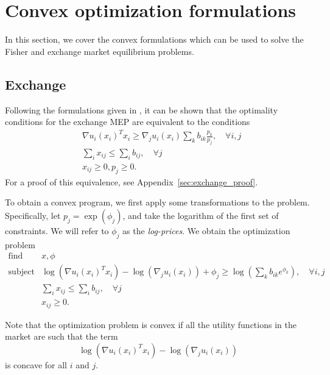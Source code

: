 \documentclass[12pt]{article}
\begin{document}
\section{Convex optimization formulations}
\label{sec:convex_form}
In this section, we cover the convex formulations which can be used to solve
the Fisher and exchange market equilibrium problems.

\subsection{Exchange}
\label{sec:convex_form_exchange}
Following the formulations given in \cite{jain2007polynomial, chen2007note, nenakov1983algorithm}, it can be shown that the optimality conditions for 
the exchange MEP are equivalent to the conditions
\[
\begin{array}{ll}
& \nabla u_i(x_i)^T x_i \geq  \nabla_j u_i(x_i) \sum_k b_{ik} \frac{p_k}{p_j}, \quad \forall i,j\\
& \sum_i x_{ij} \leq \sum_i b_{ij},\quad \forall j\\
& x_{ij} \geq 0, p_j \geq 0.
\end{array}
\]
For a proof of this equivalence, see Appendix~\ref{sec:exchange_proof}.

To obtain a convex program, we first apply some transformations to the
problem.
Specifically, let $p_j = \exp(\phi_j)$, and take the logarithm of
the first set of constraints.
We will refer to $\phi_j$ as the \emph{log-prices}.
We obtain the optimization problem %
\begin{equation}
\label{p-exchange}
\begin{array}{ll}
\mbox{find} & x, \phi \\
\mbox{subject to} & \log(\nabla u_i(x_i)^T x_i) - \log(\nabla_j u_i(x_i)) + \phi_j 
\geq \log(\sum_k b_{ik} e^{\phi_k}),\quad \forall i,j\\
& \sum_i x_{ij} \leq \sum_i b_{ij},\quad \forall j\\
& x_{ij} \geq 0.
\end{array}
\end{equation}

Note that the optimization problem is convex if all the utility functions
in the market are such that the term
\begin{equation}
\label{e-util-constraint}
\log(\nabla u_i(x_i)^T x_i) - \log(\nabla_j u_i(x_i))
\end{equation}
is concave for all $i$ and $j$.
\end{document}
